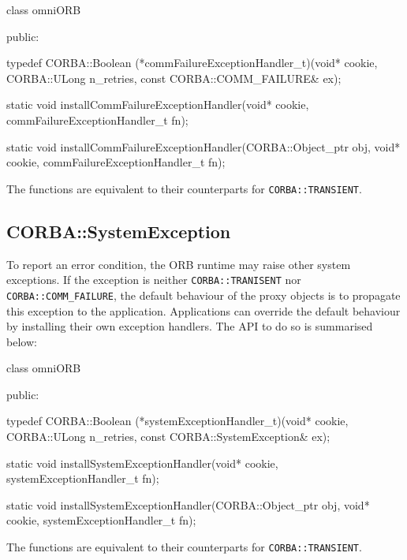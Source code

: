 \documentclass[11pt,twoside,a4paper]{book}
\newcommand{\code}[1]{\texttt{#1}}
\begin{document}
\begin{cxxlisting}
class omniORB {
public:

typedef CORBA::Boolean (*commFailureExceptionHandler_t)(void* cookie,
                                                CORBA::ULong n_retries,
                                                const CORBA::COMM_FAILURE& ex);

static void installCommFailureExceptionHandler(void* cookie,
                                             commFailureExceptionHandler_t fn);

static void installCommFailureExceptionHandler(CORBA::Object_ptr obj,
                                             void* cookie,
                                             commFailureExceptionHandler_t
                                             fn);
}
\end{cxxlisting}

The functions are equivalent to their counterparts for
\code{CORBA::TRANSIENT}.


\subsection{CORBA::SystemException}

To report an error condition, the ORB runtime may raise other system
exceptions. If the exception is neither \code{CORBA::TRANISENT} nor
\code{CORBA::COMM\_FAILURE}, the default behaviour of the proxy
objects is to propagate this exception to the application.
Applications can override the default behaviour by installing their
own exception handlers. The API to do so is summarised below:


\begin{cxxlisting}
class omniORB {
public:

typedef CORBA::Boolean (*systemExceptionHandler_t)(void* cookie,
                                            CORBA::ULong n_retries,
                                            const CORBA::SystemException& ex);

static void installSystemExceptionHandler(void* cookie,
                                          systemExceptionHandler_t fn);

static void installSystemExceptionHandler(CORBA::Object_ptr obj,
                                          void* cookie,
                                          systemExceptionHandler_t fn);
}
\end{cxxlisting}

The functions are equivalent to their counterparts for
\code{CORBA::TRANSIENT}.
\end{document}
